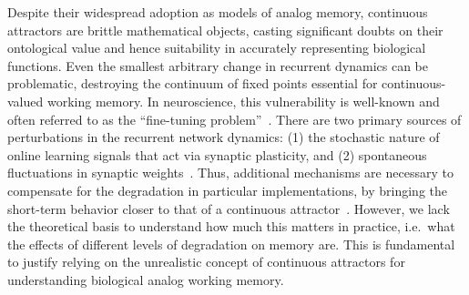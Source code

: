 \documentclass{article} %
\newcounter{ct}
\theoremstyle{definition}
\theoremstyle{remark}
\begin{document}


Despite their widespread adoption as models of analog memory, continuous attractors are brittle mathematical objects, casting significant doubts on their ontological value and hence suitability in accurately representing biological functions.
Even the smallest arbitrary change in recurrent dynamics can be problematic, destroying the continuum of fixed points essential for continuous-valued working memory.
In neuroscience, this vulnerability is well-known and often referred to as the ``fine-tuning problem''~\cite{seung1996,Renart2003,chaudhuri2016,machens2008,Park2023a,itskov2011short}.
There are two primary sources of perturbations in the recurrent network dynamics:
(1) the stochastic nature of online learning signals that act via synaptic plasticity, and
(2) spontaneous fluctuations in synaptic weights~\cite{Fusi2007-yg,shimizu2021}.
Thus, additional mechanisms are necessary to compensate for the degradation in particular implementations, by bringing the short-term behavior closer to that of a continuous attractor~\cite{Lim2012,Lim2013,Boerlin2013,Koulakov2002,Renart2003,gu2022,hansel2013short}.
However, we lack the theoretical basis to understand how much this matters in practice, i.e.\ what the effects of different levels of degradation on memory are. This is fundamental to justify relying on the unrealistic concept of continuous attractors for understanding biological analog working memory.
\end{document}
